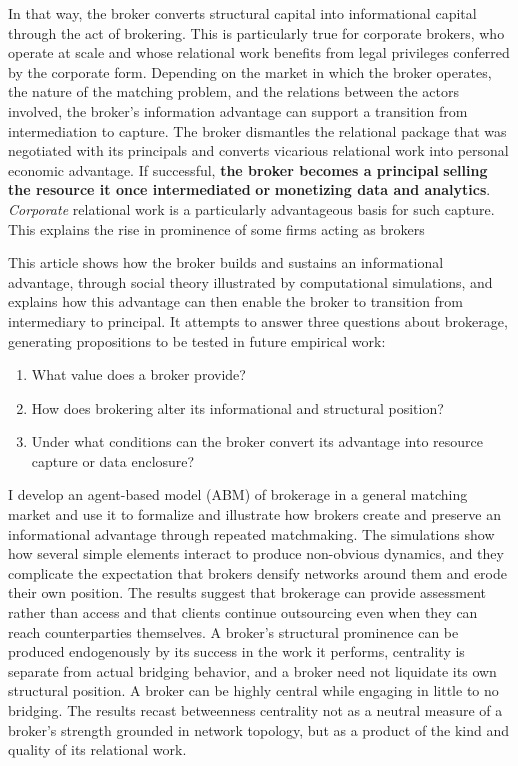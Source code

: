 \documentclass[
]{article}
\begin{document}
In that way, the broker converts structural capital into informational capital through the act of brokering. This is particularly true for corporate brokers, who operate at scale and whose relational work benefits from legal privileges conferred by the corporate form. Depending on the market in which the broker operates, the nature of the matching problem, and the relations between the actors involved, the broker's information advantage can support a transition from intermediation to capture. The broker dismantles the relational package that was negotiated with its principals and converts vicarious relational work into personal economic advantage. If successful, \textbf{the broker becomes a principal} \textbf{selling} \textbf{the resource it once intermediated} \textbf{or} \textbf{monetizing data and analytics}. \emph{Corporate} relational work is a particularly advantageous basis for such capture. This explains the rise in prominence of some firms acting as brokers

This article shows how the broker builds and sustains an informational advantage, through social theory illustrated by computational simulations, and explains how this advantage can then enable the broker to transition from intermediary to principal. It attempts to answer three questions about brokerage, generating propositions to be tested in future empirical work:

\begin{enumerate}
\def\labelenumi{(\roman{enumi})}
\item
  What value does a broker provide?
\item
  How does brokering alter its informational and structural position?
\item
  Under what conditions can the broker convert its advantage into resource capture or data enclosure?
\end{enumerate}

I develop an agent-based model (ABM) of brokerage in a general matching market and use it to formalize and illustrate how brokers create and preserve an informational advantage through repeated matchmaking. The simulations show how several simple elements interact to produce non-obvious dynamics, and they complicate the expectation that brokers densify networks around them and erode their own position. The results suggest that brokerage can provide assessment rather than access and that clients continue outsourcing even when they can reach counterparties themselves. A broker's structural prominence can be produced endogenously by its success in the work it performs, centrality is separate from actual bridging behavior, and a broker need not liquidate its own structural position. A broker can be highly central while engaging in little to no bridging. The results recast betweenness centrality not as a neutral measure of a broker's strength grounded in network topology, but as a product of the kind and quality of its relational work.
\end{document}
